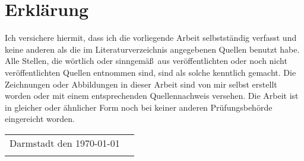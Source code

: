\pagestyle{empty} %

\chapter*{Erkl\"arung} %
\label{cha:Erkl\"arung}

\normalsize
Ich versichere hiermit, dass ich die vorliegende Arbeit selbstst\"andig verfasst und keine anderen als die im Literaturverzeichnis angegebenen Quellen benutzt habe. 
Alle Stellen, die w\"ortlich oder sinngem\"a\ss \ aus ver\"offentlichten oder noch nicht ver\"offentlichten Quellen entnommen sind, sind als solche kenntlich gemacht.
Die Zeichnungen oder Abbildungen in dieser Arbeit sind von mir selbst erstellt worden oder mit einem entsprechenden Quellennachweis versehen.
Die Arbeit ist in gleicher oder \"ahnlicher Form noch bei keiner anderen Pr\"ufungsbeh\"orde eingereicht worden.
 
\vspace{5em}
 
\begin{flushright}
\begin{table}[ht]
\begin{tabularx}{\textwidth}{Xp{7cm}}
Darmstadt den \today & \tabularnewline	\cline{2-2} \addlinespace
& \centering{Niklas Breuer}
\end{tabularx}
\end{table}
\end{flushright}
